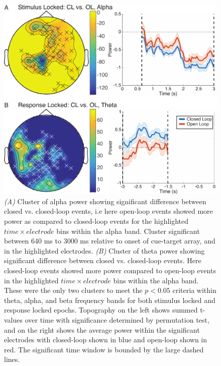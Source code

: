 \documentclass[11pt, titlepage, twoside]{article}
\begin{document}
\begin{figure}
	\begin{center}
		\includegraphics[width=.9\textwidth]{figs/deevPowerClusters_edit.pdf}
	\end{center}
	\caption[Closed vs. Open Loop EEG Clusters]{
		\emph{(A)} Cluster of alpha power showing significant difference between closed vs. closed-loop events, i.e here open-loop events showed more power as compared to closed-loop events for the highlighted $time \times electrode$ bins within the alpha band.  Cluster significant between 640 ms to 3000 ms relative to onset of cue-target array, and in the highlighted electrodes.
		\emph{(B)} Cluster of theta power showing significant difference between closed vs. closed-loop events.  Here closed-loop events showed more power compared to open-loop events in the highlighted $time \times electrode$ bins within the alpha band.  These were the only two clusters to meet the $p<0.05$ criteria within theta, alpha, and beta frequency bands for both stimulus locked and response locked epochs.  Topography on the left shows summed t-values over time with significance determined by permutation test, and on the right shows the average power within the significant electrodes with closed-loop shown in blue and open-loop shown in red.  The significant time window is bounded by the large dashed lines.
	}
	\label{fig:deevPowerClusters}
\end{figure}
\end{document}
